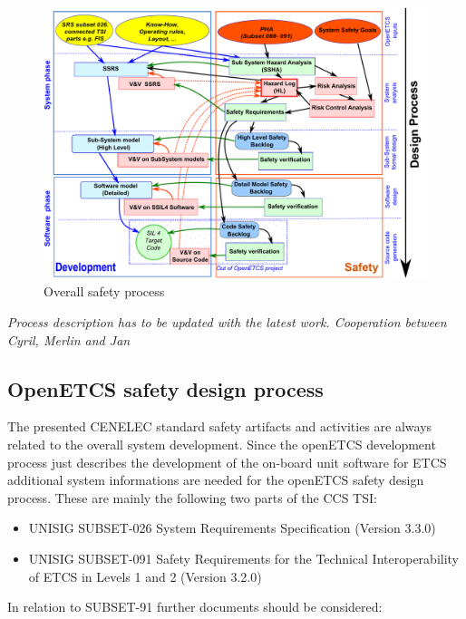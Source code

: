 \documentclass{template/openetcs_report}
\begin{document}
\begin{figure}[h]
\centering
\includegraphics[width=0.7\linewidth]{./images/WholeSafetyProcess}
\caption[Overall safety process]{Overall safety process}
\label{fig:SafetyProcess}
\end{figure}

\textit{Process description has to be updated with the latest work. Cooperation between Cyril, Merlin and Jan}

\subsection{OpenETCS safety design process}

The presented CENELEC standard safety artifacts and activities are always related to the overall system development. Since the openETCS development process just describes the development of the on-board unit software for ETCS additional system informations are needed for the openETCS safety design process. These are mainly the following two parts of the CCS TSI:

\begin{itemize}
\item UNISIG SUBSET-026	System Requirements Specification 	(Version 3.3.0)
\item UNISIG SUBSET-091 Safety Requirements for the Technical Interoperability of ETCS in Levels 1 and 2 	(Version 3.2.0)
\end{itemize}

In relation to SUBSET-91 further documents should be considered:
\end{document}
